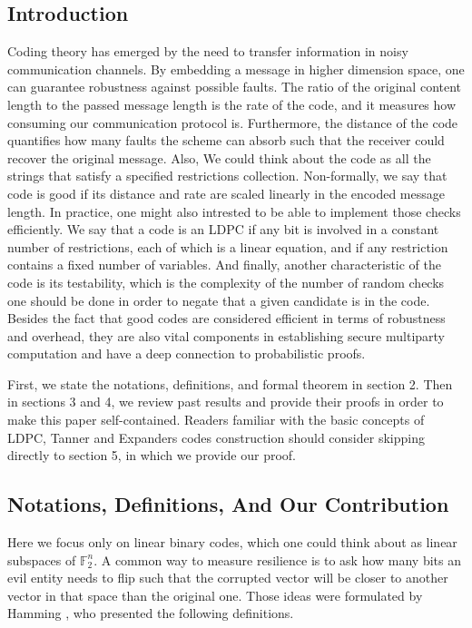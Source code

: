 \documentclass{article}
\begin{document}
\begin{multicols*}{2}
 \section{Introduction}
  Coding theory has emerged by the need to transfer information in noisy communication channels. By embedding a message in higher dimension space, one can guarantee robustness against possible faults. The ratio of the original content length to the passed message length is the rate of the code, and it measures how consuming our communication protocol is. Furthermore, the distance of the code quantifies how many faults the scheme can absorb such that the receiver could recover the original message. Also, We could think about the code as all the strings that satisfy a specified restrictions collection.
 Non-formally, we say that code is good if its distance and rate are scaled linearly in the encoded message length.  In practice, one might also intrested to be able to implement those checks efficiently. We say that a code is an LDPC if any bit is involved in a constant number of restrictions, each of which is a linear equation, and if any restriction contains a fixed number of variables. And finally, another characteristic of the code is its testability, which is the complexity of the number of random checks one should be done in order to negate that a given candidate is in the code.
Besides the fact that good codes are considered efficient in terms of robustness and overhead, they are also vital components in establishing secure multiparty computation \cite{MultiParty} and have a deep connection to probabilistic proofs.

First, we state the notations, definitions, and formal theorem in section 2. Then in sections 3 and 4, we review past results and provide their proofs in order to make this paper self-contained. Readers familiar with the basic concepts of LDPC, Tanner and Expanders codes construction should consider skipping directly to section 5, in which we provide our proof. 
\subsection{Notations, Definitions, And Our Contribution}
Here we focus only on linear binary codes, which one could think about as linear subspaces of $\mathbb{F}_{2}^{n}$. A common way to measure resilience is to ask how many bits an evil entity needs to flip such that the corrupted vector will be closer to another vector in that space than the original one. Those ideas were formulated by Hamming \cite{Hamming}, who presented the following definitions. 

\end{multicols*}
\end{document}
